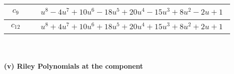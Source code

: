 \documentclass[1p]{elsarticle_modified}
\theoremstyle{definition}
\begin{document}
\begin{tabular}{m{50pt}|m{274pt}}
\hline $$\begin{aligned}c_{9}\end{aligned}$$&$\begin{aligned}
&u^8-4 u^7+10 u^6-18 u^5+20 u^4-15 u^3+8 u^2-2 u+1
\end{aligned}$\\
\hline $$\begin{aligned}c_{12}\end{aligned}$$&$\begin{aligned}
&u^8+4 u^7+10 u^6+18 u^5+20 u^4+15 u^3+8 u^2+2 u+1
\end{aligned}$\\
\hline
\end{tabular}\\~\\
\newpage\renewcommand{\arraystretch}{1}
\flushleft \textbf{(v) Riley Polynomials at the component}\newline \\
\end{document}
